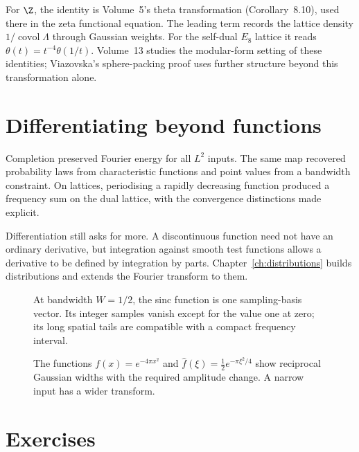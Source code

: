 For $\Z$, the identity is Volume~5's theta transformation (Corollary~8.10), used there in the zeta functional equation. The leading term records the lattice density $1/\operatorname{covol}\Lambda$ through Gaussian weights. For the self-dual $E_8$ lattice it reads $\theta(t)=t^{-4}\theta(1/t)$. Volume~13 studies the modular-form setting of these identities; Viazovska's sphere-packing proof uses further structure beyond this transformation alone.

\section{Differentiating beyond functions}

Completion preserved Fourier energy for all $L^2$ inputs. The same map recovered probability laws from characteristic functions and point values from a bandwidth constraint. On lattices, periodising a rapidly decreasing function produced a frequency sum on the dual lattice, with the convergence distinctions made explicit.

Differentiation still asks for more. A discontinuous function need not have an ordinary derivative, but integration against smooth test functions allows a derivative to be defined by integration by parts. Chapter~\ref{ch:distributions} builds distributions and extends the Fourier transform to them.

\begin{figure}[ht]
\centering{}
\caption{At bandwidth $W=1/2$, the sinc function is one sampling-basis vector. Its integer samples vanish except for the value one at zero; its long spatial tails are compatible with a compact frequency interval.}
\label{fig:v8c10samples}
\end{figure}
\begin{figure}[ht]
\centering{}
\caption{The functions $f(x)=e^{-4\pi x^2}$ and $\hat f(\xi)=\tfrac12e^{-\pi\xi^2/4}$ show reciprocal Gaussian widths with the required amplitude change. A narrow input has a wider transform.}
\label{fig:v8c10gaussian}
\end{figure}

\section{Exercises}

